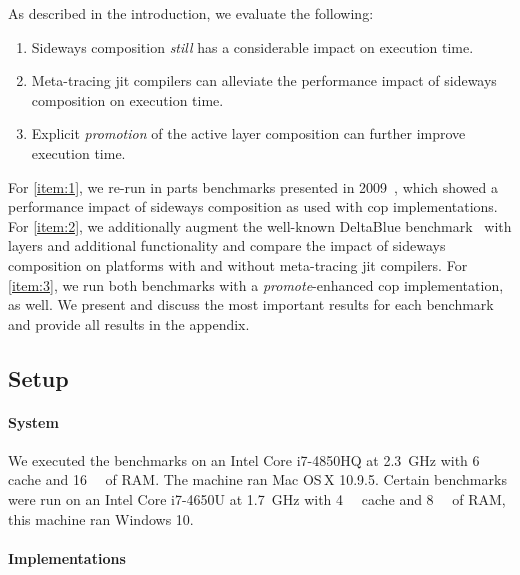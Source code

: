 \documentclass[preprint,english,10pt,nonatbib]{sigplanconf}
\begin{document}
As described in the introduction, we evaluate the following:
\begin{enumerate}
\item Sideways composition \emph{still} has a considerable impact on execution
  time.
\label{item:1}
\item Meta-tracing \ac{jit} compilers can alleviate the performance impact of
  sideways composition on execution time.
\label{item:2}
\item Explicit \emph{promotion} of the active layer composition can further
  improve execution time.
\label{item:3}
\end{enumerate}
%
For \ref{item:1}, we re-run in parts benchmarks presented in
2009~\cite{appeltauer+:2009:comparison-context-oriented}, which showed a
performance impact of sideways composition as used with \ac{cop}
implementations. For \ref{item:2}, we additionally augment the well-known
DeltaBlue benchmark~\cite{freeman-benson+:1989:deltablue-algorithm:} with
layers and additional functionality and compare the impact of sideways
composition on platforms with and without meta-tracing \ac{jit} compilers.
For \ref{item:3}, we run both benchmarks with a \emph{promote}-enhanced
\ac{cop} implementation, as well.
We present and discuss the most important results for each benchmark and
provide all results in the appendix.

\subsection{Setup}
\label{sec:setup}


\paragraph{System} We executed the benchmarks on %
an Intel Core i7-4850HQ at \SI{2.3}{\GHz} with \SI{6}{\mega\byte} cache and
\SI{16}{\giga\byte} of RAM. The machine ran Mac OS\,X 10.9.5.
Certain benchmarks were run on an Intel Core i7-4650U at \SI{1.7}{\GHz} with
\SI{4}{\mega\byte} cache and \SI{8}{\giga\byte} of RAM, this machine ran
Windows 10.
%

\paragraph{Implementations} %
\end{document}
